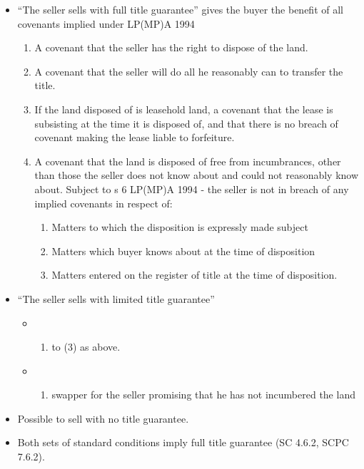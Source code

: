 \documentclass[
]{article}
\providecommand{\tightlist}{%
  \setlength{\itemsep}{0pt}\setlength{\parskip}{0pt}}
\begin{document}
\begin{itemize}
\tightlist
\item
  ``The seller sells with full title guarantee'' gives the buyer the
  benefit of all covenants implied under LP(MP)A 1994

  \begin{enumerate}
  \def\labelenumi{\arabic{enumi}.}
  \tightlist
  \item
    A covenant that the seller has the right to dispose of the land.
  \item
    A covenant that the seller will do all he reasonably can to transfer
    the title.
  \item
    If the land disposed of is leasehold land, a covenant that the lease
    is subsisting at the time it is disposed of, and that there is no
    breach of covenant making the lease liable to forfeiture.
  \item
    A covenant that the land is disposed of free from incumbrances,
    other than those the seller does not know about and could not
    reasonably know about. Subject to s 6 LP(MP)A 1994 - the seller is
    not in breach of any implied covenants in respect of:

    \begin{enumerate}
    \def\labelenumii{\arabic{enumii}.}
    \tightlist
    \item
      Matters to which the disposition is expressly made subject
    \item
      Matters which buyer knows about at the time of disposition
    \item
      Matters entered on the register of title at the time of
      disposition.
    \end{enumerate}
  \end{enumerate}
\item
  ``The seller sells with limited title guarantee''

  \begin{itemize}
  \item
    \begin{enumerate}
    \def\labelenumi{(\arabic{enumi})}
    \tightlist
    \item
      to (3) as above.
    \end{enumerate}
  \item
    \begin{enumerate}
    \def\labelenumi{(\arabic{enumi})}
    \setcounter{enumi}{3}
    \tightlist
    \item
      swapper for the seller promising that he has not incumbered the
      land
    \end{enumerate}
  \end{itemize}
\item
  Possible to sell with no title guarantee.
\item
  Both sets of standard conditions imply full title guarantee (SC 4.6.2,
  SCPC 7.6.2).
\end{itemize}
\end{document}
